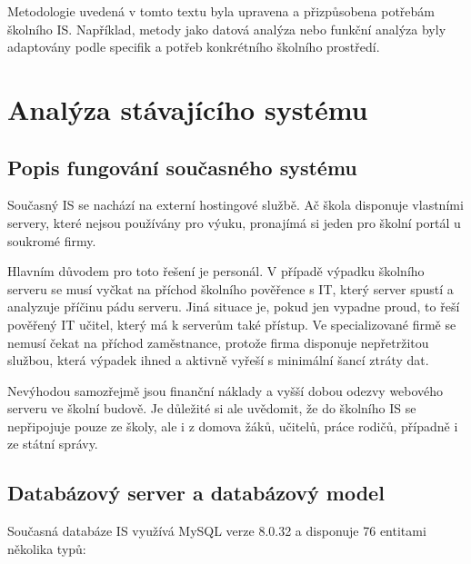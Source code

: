 \documentclass[FM,Proj]{tulthesis}
\begin{document}
Metodologie uvedená v tomto textu byla upravena a přizpůsobena potřebám školního IS.
Například, metody jako datová analýza nebo funkční analýza byly adaptovány podle
specifik a potřeb konkrétního školního prostředí.

\chapter{Analýza stávajícího systému}
\section{Popis fungování současného systému}
Současný IS se nachází na externí hostingové službě. Ač škola disponuje vlastními 
servery, které nejsou používány pro výuku, pronajímá si jeden pro školní portál u soukromé firmy.

Hlavním důvodem pro toto řešení je personál. V případě výpadku školního serveru 
se musí vyčkat na příchod školního pověřence s IT, který server spustí a analyzuje 
příčinu pádu serveru. Jiná situace je, pokud jen vypadne proud, to řeší pověřený 
IT učitel, který má k serverům také přístup. Ve specializované firmě se nemusí 
čekat na příchod zaměstnance, protože firma disponuje nepřetržitou službou, která výpadek 
ihned a aktivně vyřeší s minimální šancí ztráty dat. 

Nevýhodou samozřejmě jsou finanční náklady a vyšší dobou odezvy webového serveru 
ve školní budově. Je důležité si ale uvědomit, že do školního IS se nepřipojuje 
pouze ze školy, ale i z domova žáků, učitelů, práce rodičů, případně i ze státní správy.  

\section{Databázový server a databázový model}
Současná databáze IS využívá MySQL verze 8.0.32 a disponuje 76 entitami několika typů:
\end{document}
